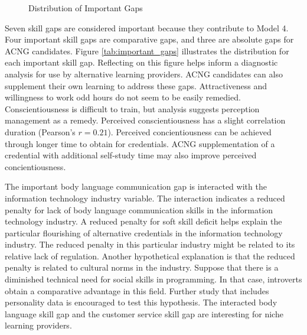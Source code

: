 \documentclass[review]{elsarticle}
\begin{document}
\begin{figure}[h!]
    \centering
    \caption{Distribution of Important Gaps}
    \label{fig:important_gaps}
\end{figure}

Seven skill gaps are considered important because they contribute to Model 4.
Four important skill gaps are comparative gaps, and three are absolute gaps for ACNG candidates.
Figure \ref{tab:important_gaps} illustrates the distribution for each important skill gap.
Reflecting on this figure helps inform a diagnostic analysis for use by alternative learning providers.
ACNG candidates can also supplement their own learning to address these gaps.
Attractiveness and willingness to work odd hours do not seem to be easily remedied.
Conscientiousness is difficult to train, but analysis suggests perception management as a remedy.
Perceived conscientiousness has a slight correlation duration (Pearson's $r = 0.21$).
Perceived concientiousness can be achieved through longer time to obtain for credentials.
ACNG supplementation of a credential with additional self-study time may also improve perceived concientiousness.

The important body language communication gap is interacted with the information technology industry variable.
The interaction indicates a reduced penalty for lack of body language communication skills
in the information technology industry.
A reduced penalty for soft skill deficit helps explain the particular flourishing of
alternative credentials in the information technology industry.
The reduced penalty in this particular industry might be related to its relative lack of regulation.
Another hypothetical explanation is that the reduced penalty is related to cultural norms in the industry.
Suppose that there is a diminished technical need for social skills in programming.
In that case, introverts obtain a comparative advantage in this field.
Further study that includes personality data is encouraged to test this hypothesis.
The interacted body language skill gap and the customer service skill gap
are interesting for niche learning providers.
\end{document}
